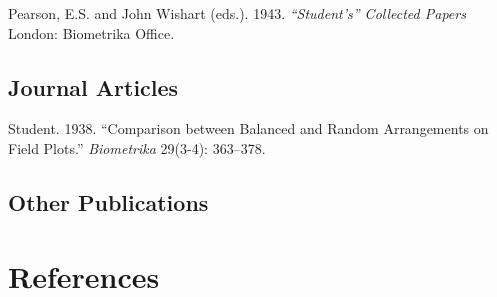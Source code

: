 \documentclass[11pt,]{article}
\begin{document}
Pearson, E.S. and John Wishart (eds.). 1943. \emph{``Student's''
Collected Papers} London: Biometrika Office.

\hypertarget{journal-articles}{%
\subsection{Journal Articles}\label{journal-articles}}

Student. 1938. ``Comparison between Balanced and Random Arrangements on
Field Plots.'' \emph{Biometrika} 29(3-4): 363--378.

\hypertarget{other-publications}{%
\subsection{Other Publications}\label{other-publications}}

\hypertarget{references}{%
\section{References}\label{references}}
\end{document}
